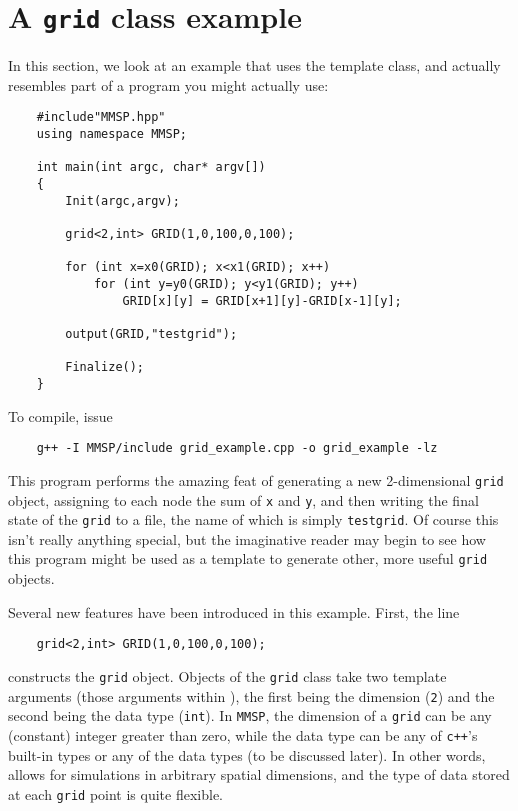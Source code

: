 \section{A {\tt grid} class example}
In this section, we look at an example that uses the  template class, and actually resembles part of a program you might actually use:
\begin{shadebox}
\begin{verbatim}
    #include"MMSP.hpp"
    using namespace MMSP;

    int main(int argc, char* argv[])
    {
        Init(argc,argv);

        grid<2,int> GRID(1,0,100,0,100);

        for (int x=x0(GRID); x<x1(GRID); x++)
            for (int y=y0(GRID); y<y1(GRID); y++)
                GRID[x][y] = GRID[x+1][y]-GRID[x-1][y];

        output(GRID,"testgrid");

        Finalize();
    }
\end{verbatim}
\end{shadebox}
To compile, issue
\begin{shadebox}
\begin{verbatim}
    g++ -I MMSP/include grid_example.cpp -o grid_example -lz
\end{verbatim}
\end{shadebox}
This program performs the amazing feat of generating a new 2-dimensional {\tt grid} object, assigning to each node the sum of {\tt x} and {\tt y}, and then writing the final state of the {\tt grid} to a file, the name of which is simply {\tt testgrid}.  Of course this isn't really anything special, but the imaginative reader may begin to see how this program might be used as a template to generate other, more useful {\tt grid} objects.

Several new features have been introduced in this example.  First, the line
\begin{shadebox}
\begin{verbatim}
    grid<2,int> GRID(1,0,100,0,100);
\end{verbatim}
\end{shadebox}
constructs the {\tt grid} object.  Objects of the {\tt grid} class take two template arguments (those arguments within {\tt < >}), the first being the dimension ({\tt 2}) and the second being the data type ({\tt int}).  In {\tt MMSP}, the dimension of a {\tt grid} can be any (constant) integer greater than zero, while the data type can be any of {\tt c++}'s built-in types or any of the \MMSP data types (to be discussed later).  In other words, \MMSP allows for simulations in arbitrary spatial dimensions, and the type of data stored at each {\tt grid} point is quite flexible.

